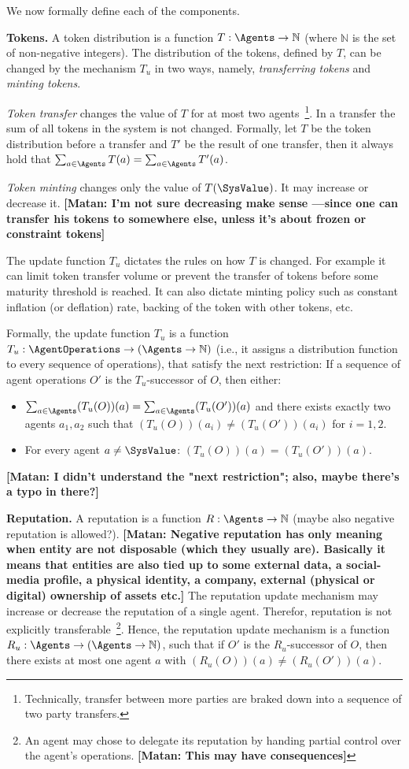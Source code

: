 \documentclass[10pt]{llncs}
\newcommand{\nat}{\mathbb{N}}
\newcommand{\MyComment}[1]{{\textbf{\color{blue} [Matan: #1]}}}
\begin{document}
We now formally define each of the components.

\noindent \textbf{Tokens.}
A token distribution is a function $T:\Agents\to \nat$ (where $\nat$ is the set of non-negative integers).
The distribution of the tokens, defined by $T$, can be changed by the mechanism $T_u$ in two ways, namely, \emph{transferring tokens} and \emph{minting tokens}.


\emph{Token transfer} changes the value of $T$ for at most two agents~\footnote{Technically, transfer between more parties are braked down into a sequence of two party transfers.}.
In a transfer the sum of all tokens in the system is not changed.
Formally, let $T$ be the token distribution before a transfer and $T'$ be the result of one transfer, then it always hold that $\sum_{a\in\Agents} T(a) = \sum_{a\in\Agents} T'(a)$.

\emph{Token minting} changes only the value of $T(\SysValue)$. It may increase or decrease it. \MyComment{I'm not sure decreasing make sense —since one can transfer his tokens to somewhere else, unless it's about frozen or constraint tokens}

The update function $T_u$ dictates the rules on how $T$ is changed.
For example it can limit token transfer volume or prevent the transfer of tokens before some maturity threshold is reached.
It can also dictate minting policy such as constant inflation (or deflation) rate, backing of the token with other tokens, etc.


Formally, the update function $T_u$ is a function $T_u:\AgentOperations \to (\Agents \to \nat)$ (i.e., it assigns a distribution function to every sequence of operations), that satisfy the next restriction:
If a sequence of agent operations $O'$ is the $T_u$-successor of $O$, then either:
\begin{itemize}
\item $\sum_{a\in\Agents} (T_u(O))(a) = \sum_{a\in\Agents} (T_u(O'))(a)$ and
there exists exactly two agents $a_1,a_2$ such that $(T_u(O))(a_i) \neq (T_u(O'))(a_i)$ for $i=1,2$.
\item For every agent $a\neq \SysValue$: $(T_u(O))(a) = (T_u(O'))(a)$.
\end{itemize}
\MyComment{I didn't understand the "next restriction"; also, maybe there's a typo in there?}

\noindent \textbf{Reputation.}
A reputation is a function $R:\Agents \to \nat$ (maybe also negative reputation is allowed?).
\MyComment{Negative reputation has only meaning when entity are not disposable (which they usually are). Basically it means that entities are also tied up to some external data, a social-media profile, a physical identity, a company, external (physical or digital) ownership of assets etc.}
The reputation update mechanism may increase or decrease the reputation of a single agent. Therefor, reputation is not explicitly transferable~\footnote{An agent may chose to delegate its reputation by handing partial control over the agent's operations. \MyComment{This may have consequences}}.
Hence, the reputation update mechanism is a function $R_u : \Agents \to (\Agents\to \nat)$, such that if $O'$ is the $R_u$-successor of $O$, then there exists at most one agent $a$ with $(R_u(O))(a)\neq(R_u(O'))(a)$.  
\end{document}
